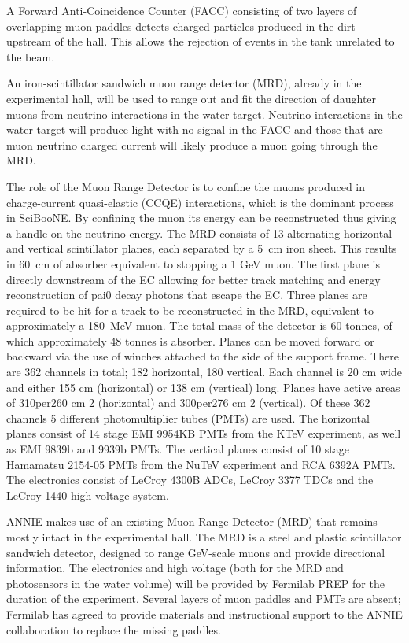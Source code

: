 A Forward Anti-Coincidence Counter (FACC) consisting of two layers of overlapping muon %
paddles detects charged particles produced in the dirt upstream of the hall.
This allows the rejection of events in the tank unrelated to the beam.

An iron-scintillator sandwich muon range detector (MRD), already in the experimental hall, %
will be used to range out and fit the direction of daughter muons from neutrino interactions %
in the water target.
Neutrino interactions in the water target will produce light with no signal in the FACC and those
that are muon neutrino charged current will likely produce a muon going through the MRD.

The role of the Muon Range Detector is to confine the muons produced in charge-current %
quasi-elastic (CCQE) interactions, which is the dominant process in SciBooNE.
By confining the muon its energy can be reconstructed thus giving a handle on the neutrino %
energy.
The MRD consists of 13 alternating horizontal and vertical scintillator planes, %
each separated by a 5~cm iron sheet.
This results in 60~cm of absorber equivalent to %
stopping a 1 GeV muon.
The first plane is directly downstream of the EC allowing for %
better track matching and energy reconstruction of pai0 decay photons that escape the EC. 
Three planes are required to be hit for a track to be reconstructed in the MRD, equivalent %
to approximately a 180~MeV muon.
The total mass of the detector is 60 tonnes, of which %
approximately 48 tonnes is absorber.
Planes can be moved forward or backward via the use %
of winches attached to the side of the support frame.
There are 362 channels in total; 182 horizontal, 180 vertical.
Each channel is 20 cm wide and either 155 cm (horizontal) or 138 cm (vertical) long.
Planes have active areas of 310per260 cm 2 (horizontal) and 300per276 cm 2 (vertical).
Of these 362 channels 5 different photomultiplier tubes (PMTs) are used.
The horizontal planes consist of 14 stage EMI 9954KB PMTs from the KTeV experiment, %
as well as EMI 9839b and 9939b PMTs.
The vertical planes consist of 10 stage Hamamatsu 2154-05 PMTs from %
the NuTeV experiment and RCA 6392A PMTs.
The electronics consist of LeCroy 4300B ADCs, LeCroy 3377 %
TDCs and the LeCroy 1440 high voltage system.

ANNIE makes use of an existing Muon Range Detector (MRD) that remains mostly intact in the %
experimental hall.
The MRD is a steel and plastic scintillator sandwich detector, designed to range %
GeV-scale muons and provide directional information.
The electronics and high voltage %
(both for the MRD and photosensors in the water volume) will be provided by Fermilab PREP %
for the duration of the experiment.
Several layers of muon paddles and PMTs are absent; Fermilab has agreed to provide %
materials and instructional support to the ANNIE collaboration to replace the %
missing paddles.

